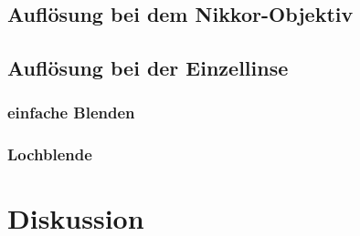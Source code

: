 	\subsection{Auflösung bei dem Nikkor-Objektiv}
		
		
	\subsection{Auflösung bei der Einzellinse}
	
		\subsubsection{einfache Blenden}
			
			
		\subsubsection{Lochblende}
		
	
		
\section{Diskussion}
	
